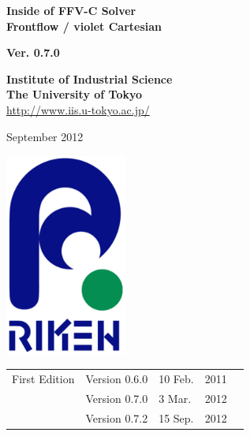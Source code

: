 \documentclass[a4paper,10pt,oneside,fleqn]{jsbook}
\begin{document}
\begin{titlepage}
\begin{center}
\vspace*{3cm}
{\huge \textbf{Inside of FFV-C Solver}}\\
\vspace{0.5cm}
{\large \textbf{Frontflow / violet Cartesian}}\\
\vspace{1cm}

{\large \textbf{Ver. 0.7.0}}\\
\vspace{1.5cm}


\large \textbf{Institute of Industrial Science}\\
\large \textbf{The University of Tokyo}\\

\url{http://www.iis.u-tokyo.ac.jp/}\\
\vspace{1cm}

September 2012\\
\vspace{4cm}

\includegraphics[width=4cm,bb=-80 0 220 500]{RIKEN_logo_300x500.eps}

\end{center}
\end{titlepage}
\newpage

%
\frontmatter

\begin{tabular}{llllr}
First Edition  &  Version 0.6.0  & 10 Feb.  & 2011\\
               &  Version 0.7.0  &  3 Mar.  & 2012\\
               &  Version 0.7.2  &  15 Sep.  & 2012


\end{tabular}
\end{document}
